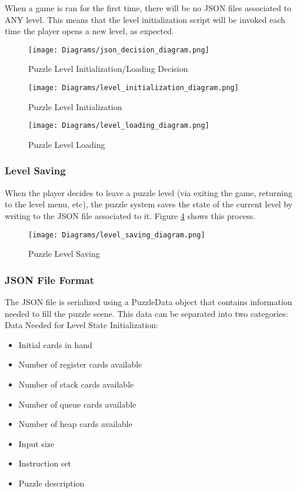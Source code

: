 When a game is ran for the first time, there will be no JSON files associated to
ANY level. This means that the level initialization script will be invoked each time
the player opens a new level, as expected.\\

\begin{figure}[!hb]
  \caption{Puzzle Level Initialization/Loading Decision}
  \label{fig:json_decision_diagram}
  \centering
  \texttt{[image: Diagrams/json\_decision\_diagram.png]}
\end{figure}
\vfill
\clearpage

\begin{figure}[!hb]
  \caption{Puzzle Level Initialization}
  \label{fig:level_initialization_diagram}
  \centering
  \texttt{[image: Diagrams/level\_initialization\_diagram.png]}
\end{figure}

\begin{figure}[!hb]
  \caption{Puzzle Level Loading}
  \label{fig:level_loading_diagram}
  \centering
  \texttt{[image: Diagrams/level\_loading\_diagram.png]}
\end{figure}
\vfill
\clearpage

\subsubsection{Level Saving}
When the player decides to leave a puzzle level (via exiting the game, returning to the
level menu, etc), the puzzle system saves the state of the current level by writing
to the JSON file associated to it. Figure \ref{fig:level_saving_diagram} shows this process.

\begin{figure}[!hb]
  \caption{Puzzle Level Saving}
  \label{fig:level_saving_diagram}
  \centering
  \texttt{[image: Diagrams/level\_saving\_diagram.png]}
\end{figure}

\subsubsection{JSON File Format}
The JSON file is serialized using a PuzzleData object that contains information
needed to fill the puzzle scene. This data can be separated into two categories:\\

Data Needed for Level State Initialization:
\begin{itemize}
  \item Initial cards in hand
  \item Number of register cards available
  \item Number of stack cards available
  \item Number of queue cards available
  \item Number of heap cards available
  \item Input size
  \item Instruction set
  \item Puzzle description
\end{itemize}

